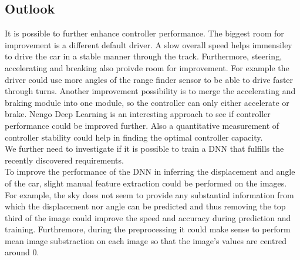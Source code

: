 \documentclass[10pt,a4paper,twoside,journal]{IEEEtran}
\begin{document}
\subsection{Outlook}
\label{ssc:outlook}
It is possible to further enhance controller performance. The biggest room for improvement is a different default driver. A slow overall speed helps immensiley to drive the car in a stable manner through the track. Furthermore, steering, accelerating and breaking also proivde room for improvement. For example the driver could use more angles of the range finder sensor to be able to drive faster through turns. Another improvement possibility is to merge the accelerating and braking module into one module, so the controller can only either accelerate or brake. Nengo Deep Learning is an interesting approach to see if controller performance could be improved further. Also a quantitative measurement of controller stability could help in finding the optimal controller capacity. \\
We further need to investigate if it is possible to train a DNN that fulfills the recently discovered requirements. \\
To improve the performance of the DNN in inferring the displacement and angle of the car, slight manual feature extraction could be performed on the images. For example, the sky does not seem to provide any substantial information from which the displacement nor angle can be predicted and thus removing the top third of the image could improve the speed and accuracy during prediction and training. Furthremore, during the preprocessing it could make sense to perform mean image substraction on each image so that the image's values are centred around 0. 



\end{document}
